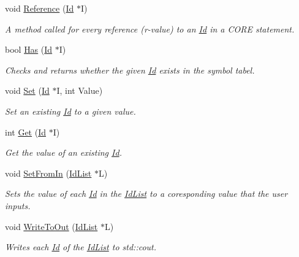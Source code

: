 \begin{DoxyCompactItemize}
void \mbox{\hyperlink{class_a_s_t_context_a0377bcdd8b7733e14906042786d1b126}{Reference}} (\mbox{\hyperlink{class_id}{Id}} $\ast$I)
\begin{DoxyCompactList}\small\item\em A method called for every reference (r-\/value) to an {\ttfamily \mbox{\hyperlink{class_id}{Id}}} in a C\+O\+RE statement. \end{DoxyCompactList}\item 
\mbox{\label{class_a_s_t_context_a5054d426dc2d3192387ef949f70960f8}} 
bool \mbox{\hyperlink{class_a_s_t_context_a5054d426dc2d3192387ef949f70960f8}{Has}} (\mbox{\hyperlink{class_id}{Id}} $\ast$I)
\begin{DoxyCompactList}\small\item\em Checks and returns whether the given {\ttfamily \mbox{\hyperlink{class_id}{Id}}} exists in the symbol tabel. \end{DoxyCompactList}\item 
void \mbox{\hyperlink{class_a_s_t_context_a60625101474904dd06d2b4ede8297a3c}{Set}} (\mbox{\hyperlink{class_id}{Id}} $\ast$I, int Value)
\begin{DoxyCompactList}\small\item\em Set an existing {\ttfamily \mbox{\hyperlink{class_id}{Id}}} to a given value. \end{DoxyCompactList}\item 
int \mbox{\hyperlink{class_a_s_t_context_a15a3e83c6f13870f563dd5034c724b78}{Get}} (\mbox{\hyperlink{class_id}{Id}} $\ast$I)
\begin{DoxyCompactList}\small\item\em Get the value of an existing {\ttfamily \mbox{\hyperlink{class_id}{Id}}}. \end{DoxyCompactList}\item 
void \mbox{\hyperlink{class_a_s_t_context_a539939d7d76d3bd308bb0fdf3d256b6f}{Set\+From\+In}} (\mbox{\hyperlink{class_id_list}{Id\+List}} $\ast$L)
\begin{DoxyCompactList}\small\item\em Sets the value of each {\ttfamily \mbox{\hyperlink{class_id}{Id}}} in the {\ttfamily \mbox{\hyperlink{class_id_list}{Id\+List}}} to a coresponding value that the user inputs. \end{DoxyCompactList}\item 
void \mbox{\hyperlink{class_a_s_t_context_a9cdb44ac644fb3b8de1eb2193b7a4f5b}{Write\+To\+Out}} (\mbox{\hyperlink{class_id_list}{Id\+List}} $\ast$L)
\begin{DoxyCompactList}\small\item\em Writes each {\ttfamily \mbox{\hyperlink{class_id}{Id}}} of the {\ttfamily \mbox{\hyperlink{class_id_list}{Id\+List}}} to {\ttfamily std\+::cout}. \end{DoxyCompactList}\end{DoxyCompactItemize}


